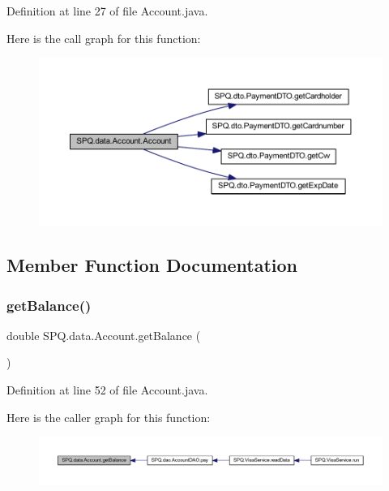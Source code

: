 Definition at line 27 of file Account.\+java.

Here is the call graph for this function\+:
\nopagebreak
\begin{figure}[H]
\begin{center}
\leavevmode
\includegraphics[width=350pt]{class_s_p_q_1_1data_1_1_account_a0d4661bfe533c8e38fc996747f3a4952_cgraph}
\end{center}
\end{figure}


\subsection{Member Function Documentation}
\mbox{\label{class_s_p_q_1_1data_1_1_account_a39cb32b817edf85d7cf23d9b39bb0dc5}} 
\subsubsection{\texorpdfstring{get\+Balance()}{getBalance()}}
{\footnotesize\ttfamily double S\+P\+Q.\+data.\+Account.\+get\+Balance (\begin{DoxyParamCaption}{ }\end{DoxyParamCaption})}



Definition at line 52 of file Account.\+java.

Here is the caller graph for this function\+:
\nopagebreak
\begin{figure}[H]
\begin{center}
\leavevmode
\includegraphics[width=350pt]{class_s_p_q_1_1data_1_1_account_a39cb32b817edf85d7cf23d9b39bb0dc5_icgraph}
\end{center}
\end{figure}
\mbox{\label{class_s_p_q_1_1data_1_1_account_ab4297cf24cbff2975364306a31e75db9}} 
